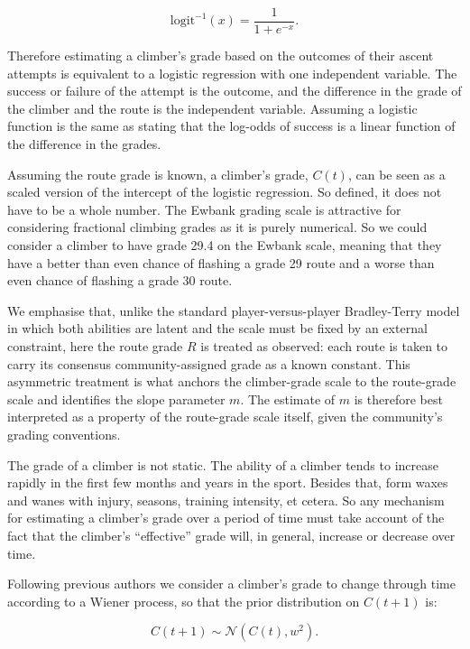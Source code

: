 \documentclass[12pt]{article}
\begin{document}
\begin{equation}
\textrm{logit}^{-1}(x) = \frac{1}{1 + e^{-x}}.
\end{equation}

Therefore estimating a climber's grade based on the outcomes of their ascent attempts is equivalent to a logistic regression with one independent variable. The success or failure of the attempt is the outcome, and the difference in the grade of the climber and the route is the independent variable. Assuming a logistic function is the same as stating that the log-odds of success is a linear function of the difference in the grades.

Assuming the route grade is known, a climber's grade, $C(t)$, can be seen as a scaled version of the intercept of the logistic regression. So defined, it does not have to be a whole number. The Ewbank grading scale is attractive for considering fractional climbing grades as it is purely numerical. So we could consider a climber to have grade 29.4 on the Ewbank scale, meaning that they have a better than even chance of flashing a grade 29 route and a worse than even chance of flashing a grade 30 route.

We emphasise that, unlike the standard player-versus-player Bradley-Terry model in which both abilities are latent and the scale must be fixed by an external constraint, here the route grade $R$ is treated as observed: each route is taken to carry its consensus community-assigned grade as a known constant. This asymmetric treatment is what anchors the climber-grade scale to the route-grade scale and identifies the slope parameter $m$. The estimate of $m$ is therefore best interpreted as a property of the route-grade scale itself, given the community's grading conventions.

The grade of a climber is not static. The ability of a climber tends to increase rapidly in the first few months and years in the sport. Besides that, form waxes and wanes with injury, seasons, training intensity, et cetera. So any mechanism for estimating a climber's grade over a period of time must take account of the fact that the climber's ``effective'' grade will, in general, increase or decrease over time.

Following previous authors  \citep{coulom2008whole,scarff2020estimation} we consider a climber's grade to change through time according to a Wiener process, so that the prior distribution on $C(t+1)$ is:

\begin{equation}
C(t+1) \sim \mathcal{N}(C(t), w^2).
\end{equation}
\end{document}
